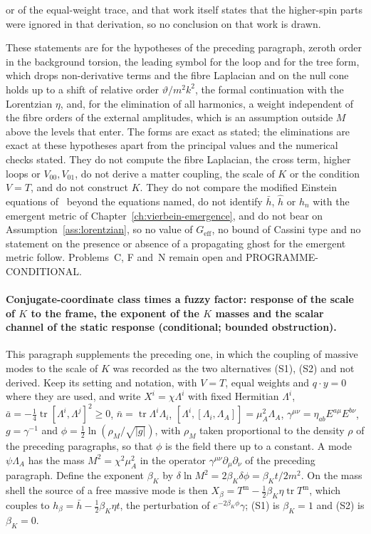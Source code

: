 or of the equal-weight trace, and that work itself states that the higher-spin parts were ignored in that derivation, so no conclusion on that work is drawn.

These statements are for the hypotheses of the preceding paragraph, zeroth order in the background torsion, the leading symbol for the loop and for the tree form, which drops non-derivative terms and the fibre Laplacian and on the null cone holds up to a shift of relative order \(\vartheta/m^2k^2\), the formal continuation with the Lorentzian \(\eta\), and, for the elimination of all harmonics, a weight independent of the fibre orders of the external amplitudes, which is an assumption outside \(M\) above the levels that enter. The forms are exact as stated; the eliminations are exact at these hypotheses apart from the principal values and the numerical checks stated. They do not compute the fibre Laplacian, the cross term, higher loops or \(V_{00},V_{01}\), do not derive a matter coupling, the scale of \(K\) or the condition \(V=T\), and do not construct \(K\). They do not compare the modified Einstein equations of~\cite{KumarSteinacker2023,Steinacker2026} beyond the equations named, do not identify \(\bar h\), \(\hat h\) or \(h_n\) with the emergent metric of Chapter~\ref{ch:vierbein-emergence}, and do not bear on Assumption~\ref{ass:lorentzian}, so no value of \(G_{\mathrm{eff}}\), no bound of Cassini type and no statement on the presence or absence of a propagating ghost for the emergent metric follow. Problems~C, F and~N remain open and PROGRAMME-CONDITIONAL.

\paragraph{Conjugate-coordinate class times a fuzzy factor: response of the scale of \(K\) to the frame, the exponent of the \(K\) masses and the scalar channel of the static response (conditional; bounded obstruction).}
This paragraph supplements the preceding one, in which the coupling of massive modes to the scale of \(K\) was recorded as the two alternatives (S1), (S2) and not derived. Keep its setting and notation, with \(V=T\), equal weights and \(q\cdot y=0\) where they are used, and write \(X^i=\chi\Lambda^i\) with fixed Hermitian \(\Lambda^i\), \(\bar a=-\tfrac14\operatorname{tr}[\Lambda^i,\Lambda^j]^2\ge0\), \(\bar n=\operatorname{tr}\Lambda^i\Lambda_i\), \([\Lambda^i,[\Lambda_i,\Lambda_A]]=\mu_A^2\Lambda_A\), \(\gamma^{\mu\nu}=\eta_{ab}E^{a\mu}E^{b\nu}\), \(g=\gamma^{-1}\) and \(\phi=\tfrac12\ln(\rho_M/\sqrt{|g|})\), with \(\rho_M\) taken proportional to the density \(\rho\) of the preceding paragraphs, so that \(\phi\) is the field there up to a constant. A mode \(\psi\Lambda_A\) has the mass \(M^2=\chi^2\mu_A^2\) in the operator \(\gamma^{\mu\nu}\partial_\mu\partial_\nu\) of the preceding paragraph. Define the exponent \(\beta_K\) by \(\delta\ln M^2=2\beta_K\delta\phi=\beta_Kt/2m^2\). On the mass shell the source of a free massive mode is then \(X_\beta=T^{\mathrm m}-\tfrac12\beta_K\eta\operatorname{tr}T^{\mathrm m}\), which couples to \(h_\beta=\bar h-\tfrac12\beta_K\eta t\), the perturbation of \(e^{-2\beta_K\phi}\gamma\); (S1) is \(\beta_K=1\) and (S2) is \(\beta_K=0\).

